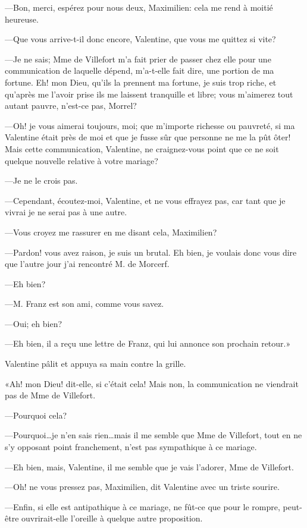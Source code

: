 —Bon, merci, espérez pour nous deux, Maximilien: cela me rend à moitié heureuse. 

—Que vous arrive-t-il donc encore, Valentine, que vous me quittez si vite? 

—Je ne sais; Mme de Villefort m'a fait prier de passer chez elle pour une communication de laquelle dépend, m'a-t-elle fait dire, une portion de ma fortune. Eh! mon Dieu, qu'ils la prennent ma fortune, je suis trop riche, et qu'après me l'avoir prise ils me laissent tranquille et libre; vous m'aimerez tout autant pauvre, n'est-ce pas, Morrel? 

—Oh! je vous aimerai toujours, moi; que m'importe richesse ou pauvreté, si ma Valentine était près de moi et que je fusse sûr que personne ne me la pût ôter! Mais cette communication, Valentine, ne craignez-vous point que ce ne soit quelque nouvelle relative à votre mariage? 

—Je ne le crois pas. 

—Cependant, écoutez-moi, Valentine, et ne vous effrayez pas, car tant que je vivrai je ne serai pas à une autre. 

—Vous croyez me rassurer en me disant cela, Maximilien? 

—Pardon! vous avez raison, je suis un brutal. Eh bien, je voulais donc vous dire que l'autre jour j'ai rencontré M. de Morcerf. 

—Eh bien? 

—M. Franz est son ami, comme vous savez. 

—Oui; eh bien? 

—Eh bien, il a reçu une lettre de Franz, qui lui annonce son prochain retour.» 

Valentine pâlit et appuya sa main contre la grille. 

«Ah! mon Dieu! dit-elle, si c'était cela! Mais non, la communication ne viendrait pas de Mme de Villefort. 

—Pourquoi cela? 

—Pourquoi\dots je n'en sais rien\dots mais il me semble que Mme de Villefort, tout en ne s'y opposant point franchement, n'est pas sympathique à ce mariage. 

—Eh bien, mais, Valentine, il me semble que je vais l'adorer, Mme de Villefort. 

—Oh! ne vous pressez pas, Maximilien, dit Valentine avec un triste sourire. 

—Enfin, si elle est antipathique à ce mariage, ne fût-ce que pour le rompre, peut-être ouvrirait-elle l'oreille à quelque autre proposition. 

